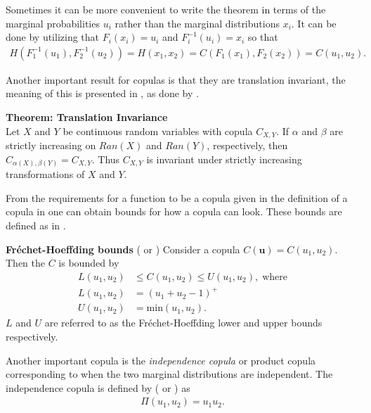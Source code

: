 Sometimes it can be more convenient to write the  theorem in terms of the marginal probabilities $u_i$ rather than the marginal distributions $x_i$. It can be done by utilizing that $F_i(x_i) = u_i$ and $F_i^{-1}(u_i)= x_i$ so that 
\begin{align*}
    H(F_1^{-1}(u_1),F_2^{-1}(u_2))=H(x_1,x_2) = C(F_1(x_1), F_2(x_2))= C(u_1, u_2).
\end{align*}

Another important result for copulas is that they are translation invariant, the meaning of this is presented in , as done by \citet[p.~25]{Nelsen2006}.

\begin{theorem}\label{the:TranslationInvariance}
        \textbf{Theorem: Translation Invariance}\\
        Let $X$ and $Y$ be continuous random variables with copula $C_{X, Y}$. If $\alpha$ and $\beta$ are strictly increasing on $Ran(X)$ and $Ran(Y)$, respectively, then $C_{\alpha(X),\beta(Y)}  = C_{X,Y}$. Thus $C_{X, Y}$ is invariant under strictly increasing transformations of $X$ and $Y$.
\end{theorem}

From the requirements for a function to be a copula given in the definition of a copula in  one can obtain bounds for how a copula can look. These bounds are defined as in .
    
\begin{theorem}\label{thm:FrechetBounds}
    \textbf{Fréchet-Hoeffding bounds} ( or )
    Consider a copula $C(\mathbf{u}) = C(u_1,u_2)$. Then the $C$ is bounded by
    \begin{align*}
        L(u_1,u_2) &\leq C(u_1,u_2) \leq U(u_1,u_2),\; \mathrm{ where}\\
        L(u_1,u_2) &= (u_1+u_2-1)^+\\
        U(u_1,u_2) &= \mathrm{min}(u_1,u_2).
    \end{align*}
    $L$ and $U$ are referred to as the Fréchet-Hoeffding lower and upper bounds respectively. 
\end{theorem}

Another important copula is the \emph{independence copula} or product copula corresponding to when the two marginal distributions are independent. The independence copula is defined by (\citet[p.~712]{BrigoMercurio2006} or \citet[p.~7]{Schmidt2006}) as
\begin{align*}
    \Pi(u_1,u_2) = u_1u_2.
\end{align*}

